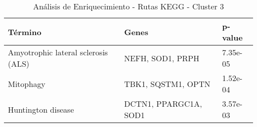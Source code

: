 \begin{table}[H]
	\centering
	\caption{Análisis de Enriquecimiento - Rutas KEGG - Cluster 3}
	\label{tb:c2_t4}
	\begin{tabular}{|p{4cm}|p{4cm}|p{3cm}|}
		\hline
		\textbf{Término} & \textbf{Genes} & \textbf{p-value} \\ \hline
		Amyotrophic lateral sclerosis (ALS) & NEFH, SOD1, PRPH & 7.35e-05 \\ \hline
		Mitophagy & TBK1, SQSTM1, OPTN & 1.52e-04 \\ \hline
		Huntington disease & DCTN1, PPARGC1A, SOD1 & 3.57e-03 \\ \hline
	\end{tabular}
\end{table}






